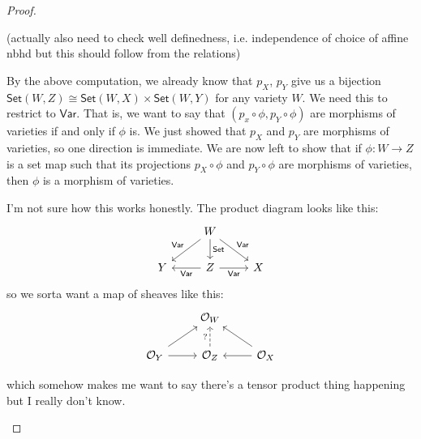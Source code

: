 \begin{proof}
\begin{enumerate}[label = (\alph*)]
        (actually also need to check well definedness, i.e. independence of choice of affine nbhd but this should follow from the relations)

        By the above computation, we already know that $p_X$, $p_Y$ give us a bijection $\mathsf{Set}(W, Z) \cong \mathsf{Set}(W, X) \times \mathsf{Set}(W, Y)$ for any variety $W$. We need this to restrict to $\mathsf{Var}$. That is, we want to say that $(p_x \circ \phi, p_Y \circ \phi)$ are morphisms of varieties if and only if $\phi$ is. We just showed that $p_X$ and $p_Y$ are morphisms of varieties, so one direction is immediate. We are now left to show that if $\phi: W \longrightarrow Z$ is a set map such that its projections $p_X \circ \phi$ and $p_Y \circ \phi$ are morphisms of varieties, then $\phi$ is a morphism of varieties.

        I'm not sure how this works honestly. The product diagram looks like this:
        $$
             \begin{tikzcd}
                 & W \arrow[dr, "\mathsf{Var}"] \arrow[dl, swap, "\mathsf{Var}"] \arrow[d, "\mathsf{Set}"]\\
                 Y & Z \arrow[l, "\mathsf{Var}"] \arrow[r, "\mathsf{Var}", swap] & X
             \end{tikzcd}
        $$
        so we sorta want a map of sheaves like this:
        $$
        \begin{tikzcd}
             & \mathcal O_W \\
             \mathcal O_Y \arrow[ur] \arrow[r] & \mathcal O_Z \arrow[u, dashed, "?"] & \mathcal O_X \arrow[ul] \arrow[l]
        \end{tikzcd}
        $$

        which somehow makes me want to say there's a tensor product thing happening but I really don't know.
    \end{enumerate}
\end{proof}
